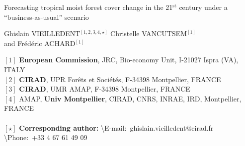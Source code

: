 \renewcommand{\bibsection}{}  %

\begin{center}
  \LARGE{Forecasting tropical moist forest cover change in the 21$^{\text{st}}$ century under a ``business-as-usual'' scenario}
\end{center}

\vspace{1cm}

\begin{center}
  \large{
  Ghislain VIEILLEDENT$^{[1, 2, 3, 4, \star]}$ \hspace{0.5cm} Christelle VANCUTSEM$^{[1]}$\\
  \vspace{0.5cm}
  and \hspace{0.5cm} Frédéric ACHARD$^{[1]}$
  }
\end{center}

\vspace{1cm}

{\small
  \begin{flushleft}  
    $[1]$ \textbf{European Commission}, JRC, Bio-economy Unit, I-21027 Ispra (VA), ITALY\\
    $[2]$ \textbf{CIRAD}, UPR Forêts et Sociétés, F-34398 Montpellier, FRANCE\\
    $[3]$ \textbf{CIRAD}, UMR AMAP, F-34398 Montpellier, FRANCE\\
    $[4]$ AMAP, \textbf{Univ Montpellier}, CIRAD, CNRS, INRAE, IRD, Montpellier, FRANCE\\
    ~\\
    $[\star]$ \textbf{Corresponding author:}
    \textbackslash{E-mail}:~ghislain.vieilledent@cirad.fr
    \textbackslash{Phone}:~+33 4 67 61 49 09\\
  \end{flushleft}}

\newpage
